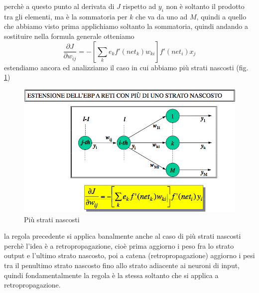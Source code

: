 perchè a questo punto al derivata di $J$ rispetto ad $y_i$ non è soltanto il prodotto tra gli elementi, ma è la sommatoria per $k$ che va da uno ad $M$, quindi a quello che abbiamo visto prima applichiamo soltanto la sommatoria, quindi andando a sostituire nella formula generale otteniamo
\begin{equation}
\frac{\partial J}{\partial w_{ij}} = - \left[ \sum_k e_k f'(net_k) w_{ki} \right] f'(net_i)x_j
\end{equation}
estendiamo ancora ed analizziamo il caso in cui abbiamo più strati nascosti (fig. \ref{hp4})
\begin{figure}
\centering
\includegraphics[scale=0.5]{img/hp4.png}
\caption{Più strati nascosti}
\label{hp4}
\end{figure}
la regola precedente si applica banalmente anche al caso di più strati nascosti perchè l'idea è a retropropagazione, cioè prima aggiorno i peso fra lo strato output e l'ultimo strato nascosto, poi a catena (retropropagazione) aggiorno i pesi tra il penultimo strato nascosto fino allo strato adiacente ai neuroni di input, quindi fondamentalmente la regola è la stessa soltanto che si applica a retropropagazione.\\

